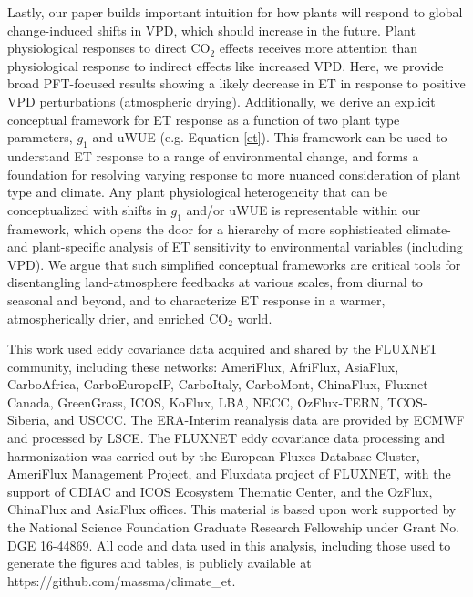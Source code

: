 \documentclass[draft,linenumbers]{agujournal}
\begin{document}
Lastly, our paper builds important intuition for how plants will
respond to global change-induced shifts in VPD, which should increase
in the future. Plant physiological responses to direct CO$_2$ effects
\citep[e.g.,][]{Swann_2016} receives more attention than physiological
response to indirect effects like increased VPD. Here, we provide
broad PFT-focused results showing a likely decrease in ET in response
to positive VPD perturbations (atmospheric drying). Additionally, we
derive an explicit conceptual framework for ET response as a function
of two plant type parameters, $g_1$ and uWUE (e.g. Equation
\ref{et}). This framework can be used to understand ET response to a
range of environmental change, and forms a foundation for resolving
varying response to more nuanced consideration of plant type and
climate. Any plant physiological heterogeneity that can be
conceptualized with shifts in $g_1$ \citep[e.g.][]{Lin_2015} and/or
uWUE \citep[e.g.][]{Zhou_2014} is representable within our framework,
which opens the door for a hierarchy of more sophisticated climate-
and plant-specific analysis of ET sensitivity to environmental
variables (including VPD). We argue that such simplified conceptual
frameworks are critical tools for disentangling land-atmosphere
feedbacks at various scales, from diurnal to seasonal and beyond, and
to characterize ET response in a warmer, atmospherically drier, and
enriched CO$_2$ world.


\acknowledgments This work used eddy covariance data acquired and
shared by the FLUXNET community, including these networks: AmeriFlux,
AfriFlux, AsiaFlux, CarboAfrica, CarboEuropeIP, CarboItaly, CarboMont,
ChinaFlux, Fluxnet-Canada, GreenGrass, ICOS, KoFlux, LBA, NECC,
OzFlux-TERN, TCOS-Siberia, and USCCC. The ERA-Interim reanalysis data
are provided by ECMWF and processed by LSCE. The FLUXNET eddy
covariance data processing and harmonization was carried out by the
European Fluxes Database Cluster, AmeriFlux Management Project, and
Fluxdata project of FLUXNET, with the support of CDIAC and ICOS
Ecosystem Thematic Center, and the OzFlux, ChinaFlux and AsiaFlux
offices. This material is based upon work supported by the National
Science Foundation Graduate Research Fellowship under Grant No. DGE
16-44869. All code and data used in this analysis, including those
used to generate the figures and tables, is publicly available at
https://github.com/massma/climate\_et.



\end{document}
